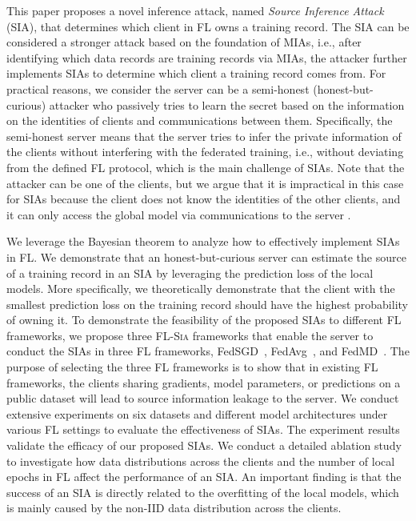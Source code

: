 \documentclass[10pt,journal,compsoc]{IEEEtran}
\begin{document}
{This paper proposes a novel inference attack, named \textit{Source Inference Attack} (SIA), that determines which client in FL owns a training record. The SIA can be considered a stronger attack based on the foundation of MIAs, {i.e.}, after identifying which data records are training records via MIAs, the attacker further implements SIAs to determine which client a training record comes from. For practical reasons, we consider the server can be a semi-honest (honest-but-curious) attacker who passively tries to learn the secret based on the information on the identities of clients and communications between them. Specifically, the semi-honest server means that the server tries to infer the private information of the clients without interfering with the federated training, {i.e.,} without deviating from the defined FL protocol, which is the main challenge of SIAs. Note that the attacker can be one of the clients, but we argue that it is impractical in this case for SIAs because the client does not know the identities of the other clients, and it can only access the global model via communications to the server \cite{lyu2022privacy}. }

We leverage the Bayesian theorem to analyze how to effectively implement SIAs in FL. We demonstrate that an honest-but-curious server can estimate the source of a training record in an SIA by leveraging the prediction loss of the local models. More specifically, we theoretically demonstrate that the client with the smallest prediction loss on the training record should have the highest probability of owning it. To demonstrate the feasibility of the proposed SIAs to different FL frameworks, we propose three \textsc{FL-Sia} frameworks that enable the server to conduct the SIAs in three FL frameworks, FedSGD~\cite{mcmahan2017communication}, FedAvg~\cite{mcmahan2017communication}, and FedMD~\cite{li2019fedmd}. The purpose of selecting the three FL frameworks is to show that in existing FL frameworks, the clients sharing gradients, model parameters, or predictions on a public dataset will lead to source information leakage to the server. We conduct extensive experiments on six datasets and different model architectures under various FL settings to evaluate the effectiveness of SIAs. The experiment results validate the efficacy of our proposed SIAs. We conduct a detailed ablation study to investigate how data distributions across the clients and the number of local epochs in FL affect the performance of an SIA. An important finding is that the success of an SIA is directly related to the overfitting of the local models, which is mainly caused by the non-IID data distribution across the clients. 
\end{document}
